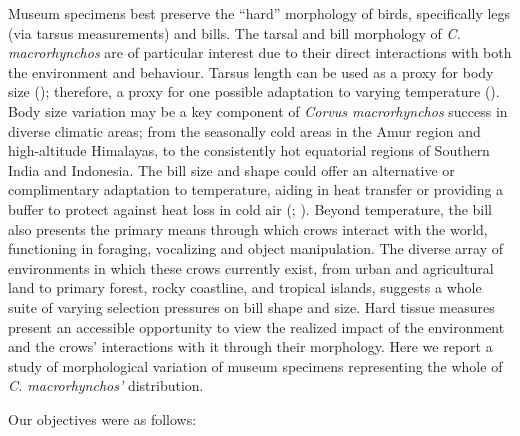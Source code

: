 \documentclass[10pt,a4paper]{article}
\begin{document}
Museum specimens best preserve the ``hard'' morphology of birds, specifically legs (via tarsus measurements) and bills.
The tarsal and bill morphology of \emph{C. macrorhynchos} are of particular interest due to their direct interactions with both the environment and behaviour.
Tarsus length can be used as a proxy for body size (); therefore, a proxy for one possible adaptation to varying temperature ().
Body size variation may be a key component of \emph{Corvus macrorhynchos} success in diverse climatic areas; from the seasonally cold areas in the Amur region and high-altitude Himalayas, to the consistently hot equatorial regions of Southern India and Indonesia.
The bill size and shape could offer an alternative or complimentary adaptation to temperature, aiding in heat transfer or providing a buffer to protect against heat loss in cold air (; ).
Beyond temperature, the bill also presents the primary means through which crows interact with the world, functioning in foraging, vocalizing and object manipulation.
The diverse array of environments in which these crows currently exist, from urban and agricultural land to primary forest, rocky coastline, and tropical islands, suggests a whole suite of varying selection pressures on bill shape and size.
Hard tissue measures present an accessible opportunity to view the realized impact of the environment and the crows' interactions with it through their morphology.
Here we report a study of morphological variation of museum specimens representing the whole of \emph{C. macrorhynchos'} distribution.

Our objectives were as follows:
\end{document}
